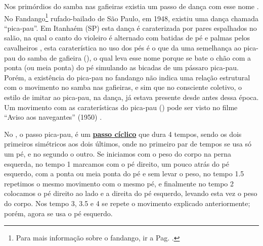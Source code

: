 Nos primórdios do samba nas gafieiras existia um passo de dança com esse nome \cite[pp. 142]{perna2002samba}.
No Fandango\footnote{Para mais informação sobre o fandango, ir a Pag. \pageref{fig:fandango}.} 
rufado-bailado de São Paulo, em 1948, existiu uma dança chamada ``pica-pau''.
Em Itanhaém (SP) esta dança é caraterizada por pares espalhados no salão,
na qual o canto do violeiro é alternado com batidas de pé e palmas pelos 
cavalheiros \cite[pp. 607-608]{marcondes1977enciclopediav2} \cite[pp. 49]{fandangoSP},
esta caraterística no uso dos pés é o que da uma semelhança ao pica-pau do samba de gafieira (\AnoLivro),
o qual leva esse nome porque se bate o chão com a ponta (ou meia ponta) do pé simulando as bicadas de um pássaro pica-pau.
Porém, a existência do pica-pau no fandango não indica uma relação estrutural com o movimento no samba nas gafieiras,
e sim que no consciente coletivo, o estilo de imitar ao pica-pau, na dança,
já estava presente desde antes dessa época.
Um movimento com as caraterísticas do pica-pau (\AnoLivro) pode ser visto 
no filme ``Aviso aos navegantes'' (1950) \cite[min. 40:35]{AtlantidaDance}.


No \AnoLivro, o passo pica-pau, é um \hyperref[def:PassoCiclico]{\textbf{passo cíclico}} que dura 4 tempos, 
sendo os dois primeiros simétricos aos dois últimos, 
onde no primeiro par de tempos se usa só um pé,
e no segundo o outro.
Se iniciamos com o peso do corpo na perna esquerda, 
no tempo 1 marcamos com o pé direito, um pouco atrás do pé esquerdo, 
com a ponta ou meia ponta do pé e sem levar o peso,
no tempo 1.5 repetimos o mesmo movimento com o mesmo pé, e finalmente
no tempo 2 colocamos o pé direito ao lado e a direita do pé esquerdo, 
levando esta vez o peso do corpo. 
Nos tempo 3, 3.5 e 4 se repete o movimento explicado anteriormente; porém,
agora se usa o pé esquerdo.
  
